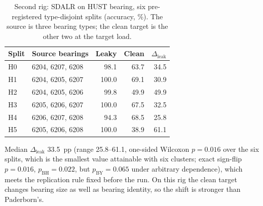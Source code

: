 \begin{table}[htbp]
\centering
\caption{Second rig: SDALR on HUST bearing, six pre-registered type-disjoint splits (accuracy, \%). The source is three bearing types; the clean target is the other two at the target load.}
\label{tab:hust}
\begin{tabular}{llrrr}
\toprule
Split & Source bearings & Leaky & Clean & $\Delta_{\mathrm{leak}}$ \\
\midrule
H0 & 6204, 6207, 6208 & 98.1 & 63.7 & 34.5 \\
H1 & 6204, 6205, 6207 & 100.0 & 69.1 & 30.9 \\
H2 & 6204, 6205, 6206 & 99.8 & 49.9 & 49.9 \\
H3 & 6205, 6206, 6207 & 100.0 & 67.5 & 32.5 \\
H4 & 6206, 6207, 6208 & 94.3 & 68.5 & 25.8 \\
H5 & 6205, 6206, 6208 & 100.0 & 38.9 & 61.1 \\
\bottomrule
\end{tabular}
\begin{minipage}{\linewidth}\vspace{2pt}\footnotesize Median $\Delta_{\mathrm{leak}}$ 33.5~pp (range 25.8--61.1, one-sided Wilcoxon $p=0.016$ over the six splits, which is the smallest value attainable with six clusters; exact sign-flip $p=0.016$, $p_{\mathrm{BH}}=0.022$, but $p_{\mathrm{BY}}=0.065$ under arbitrary dependence), which meets the replication rule fixed before the run. On this rig the clean target changes bearing size as well as bearing identity, so the shift is stronger than Paderborn's.\end{minipage}
\end{table}
